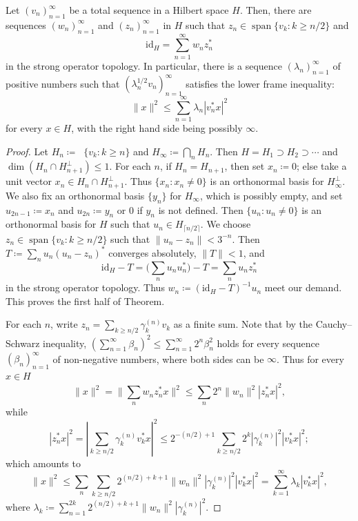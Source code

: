 \documentclass[10pt,a4paper]{amsart}
\DeclareMathOperator{\clh}{\overline{span}}
\DeclareMathOperator{\lh}{span}
\newcommand{\id}{\mathrm{id}}
\begin{document}
\begin{thm*}
Let $( v_n )_{n=1}^\infty$ be a total sequence in a Hilbert space $H$. 
Then, there are sequences $(w_n)_{n=1}^\infty$ and $(z_n)_{n=1}^\infty$ 
in $H$ such that $z_n\in\lh\{ v_k : k\geq n/2\}$ and 
$$\id_H=\sum_{n=1}^\infty w_nz_n^*$$
in the strong operator topology. 
In particular, 
there is a sequence $(\lambda_n)_{n=1}^\infty$ 
of positive numbers such that $(\lambda_n^{1/2}v_n)_{n=1}^\infty$
satisfies the lower frame inequality: 
\[
\| x\|^2 \le \sum_{n=1}^\infty\lambda_n |v_n^*x|^2 
\]
for every $x\in H$, with the right hand side being possibly $\infty$.
\end{thm*}

\begin{proof}
Let $H_n\coloneqq\clh\{ v_k : k\geq n \}$ and $H_\infty\coloneqq\bigcap_n H_n$. 
Then $H=H_1\supset H_2\supset\cdots$ and 
$\dim(H_n\cap H_{n+1}^\perp)\le1$. 
For each $n$, if $H_n=H_{n+1}$, then set $x_n\coloneqq0$; 
else take a unit vector 
$x_n\in H_n\cap H_{n+1}^\perp$. 
Thus $\{ x_n : x_n\neq0\}$ is an orthonormal 
basis for $H_\infty^\perp$.
We also fix an orthonormal basis $\{ y_n\}$ for $H_\infty$, 
which is possibly empty, and 
set $u_{2n-1} \coloneqq x_n$ and $u_{2n}\coloneqq y_n$ 
or 0 if $y_n$ is not defined. 
Then $\{ u_n : u_n\neq0\}$ is an orthonormal basis 
for $H$ such that $u_n\in H_{\lceil n/2\rceil}$. 
We choose $z_n\in\lh\{ v_k : k\geq n/2\}$ such that 
$\| u_n - z_n \| < 3^{-n}$. 
Then $T\coloneqq\sum_n u_n (u_n-z_n)^*$ converges absolutely, 
$\|T\|<1$, and 
$$\id_H-T=\bigl(\sum_n u_nu_n^*\bigr)-T = \sum_n u_nz_n^*$$ 
in the strong operator topology. 
Thus $w_n\coloneqq(\id_H-T)^{-1}u_n$ meet our demand. 
This proves the first half of Theorem.

For each $n$, 
write $z_n = \sum_{k\geq n/2} \gamma^{(n)}_k v_k$ 
as a finite sum. 
Note that by the Cauchy--Schwarz inequality, 
$(\sum_{n=1}^\infty \beta_n)^2\le \sum_{n=1}^\infty 2^n\beta_n^2$ 
holds for every sequence $(\beta_n)_{n=1}^\infty$ 
of non-negative numbers, where 
both sides can be $\infty$. 
Thus for every $x\in H$ 
\[
\|x\|^2 = \|\sum_n w_n z_n^*x\|^2 
\le\sum_n 2^n\|w_n\|^2|z_n^*x|^2,
\]
while 
\[
|z_n^*x|^2=|\sum_{k\geq n/2}\gamma^{(n)}_k v_k^*x |^2
\le 2^{-(n/2)+1}\sum_{k\geq n/2} 2^k|\gamma^{(n)}_k|^2 |v_k^*x |^2;
\]
which amounts to 
\[
\|x\|^2 \le \sum_n\sum_{k\geq n/2}2^{(n/2)+k+1}\|w_n\|^2|\gamma^{(n)}_k|^2 |v_k^*x |^2
=\sum_{k=1}^\infty\lambda_k |v_k^*x |^2,
\]
where $\lambda_k\coloneqq\sum_{n=1}^{2k}2^{(n/2)+k+1}\|w_n\|^2|\gamma^{(n)}_k|^2$.
\end{proof}
\end{document}
